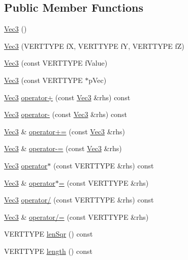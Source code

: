 \subsection*{Public Member Functions}
\begin{DoxyCompactItemize}
\item 
\hyperlink{struct_vec3_aae7a1ffaa1108a30c281da216d1cd312}{Vec3} ()
\item 
\hyperlink{struct_vec3_a11b912ffee98b8131bafd07862e190fd}{Vec3} (VERTTYPE fX, VERTTYPE fY, VERTTYPE fZ)
\item 
\hyperlink{struct_vec3_a77df65b759292867312a32472ce63a25}{Vec3} (const VERTTYPE fValue)
\item 
\hyperlink{struct_vec3_a9c01845901d10707568cdebc8c211b0f}{Vec3} (const VERTTYPE $\ast$pVec)
\item 
\hyperlink{struct_vec3}{Vec3} \hyperlink{struct_vec3_a93eb39d022851b48795f794b4bcf78ea}{operator+} (const \hyperlink{struct_vec3}{Vec3} \&rhs) const 
\item 
\hyperlink{struct_vec3}{Vec3} \hyperlink{struct_vec3_ae64fd4e2f0f35d4b27bfee4d8cba665f}{operator-\/} (const \hyperlink{struct_vec3}{Vec3} \&rhs) const 
\item 
\hyperlink{struct_vec3}{Vec3} \& \hyperlink{struct_vec3_a6721548a281336cf0047f21896befbd0}{operator+=} (const \hyperlink{struct_vec3}{Vec3} \&rhs)
\item 
\hyperlink{struct_vec3}{Vec3} \& \hyperlink{struct_vec3_a3f1a7c8642549891d1eed6dddfe2e12b}{operator-\/=} (const \hyperlink{struct_vec3}{Vec3} \&rhs)
\item 
\hyperlink{struct_vec3}{Vec3} \hyperlink{struct_vec3_a0cc157c29980fef10046b52a8a3f76f7}{operator$\ast$} (const VERTTYPE \&rhs) const 
\item 
\hyperlink{struct_vec3}{Vec3} \& \hyperlink{struct_vec3_a9f850360a7b1050952383bcaea2a5c39}{operator$\ast$=} (const VERTTYPE \&rhs)
\item 
\hyperlink{struct_vec3}{Vec3} \hyperlink{struct_vec3_a0161abcc7f6cf05b59a601eba283623f}{operator/} (const VERTTYPE \&rhs) const 
\item 
\hyperlink{struct_vec3}{Vec3} \& \hyperlink{struct_vec3_a47169024ad383398f1128683b66a5640}{operator/=} (const VERTTYPE \&rhs)
\item 
VERTTYPE \hyperlink{struct_vec3_a36d9184d9e098ad5caf944c1aea4f496}{lenSqr} () const 
\item 
VERTTYPE \hyperlink{struct_vec3_ab45419fb66ad8d8397818349b2e4da10}{length} () const 
\item 

\end{DoxyCompactItemize}
